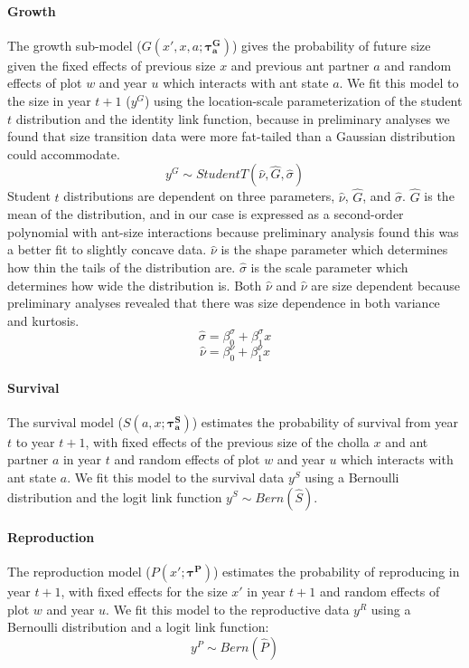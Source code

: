 \documentclass[11pt]{article}
\begin{document}
\paragraph{Growth}
The growth sub-model ($G(x',x,a;\pmb{\tau^G_{a}})$) gives the probability of future size given the fixed effects of previous size $x$ and previous ant partner $a$ and random effects of plot $w$ and year $u$ which interacts with ant state $a$. 
We fit this model to the size in year $t+1$ ($y^G$) using the location-scale parameterization of the student $t$ distribution and the identity link function, because in preliminary analyses we found that size transition data were more fat-tailed than a Gaussian distribution could accommodate. 
$$y^G \sim Student T(\hat{\nu},\hat{G},\hat{\sigma}) $$
Student $t$ distributions are dependent on three parameters, $\hat{\nu}$,  $\hat{G}$, and $\hat{\sigma}$.
$\hat{G}$ is the mean of the distribution, and in our case is expressed as a second-order polynomial with ant-size interactions because  preliminary analysis found this was a better fit to slightly concave data. 
$\hat{\nu}$ is the shape parameter which determines how thin the tails of the distribution are.
$\hat{\sigma}$ is the scale parameter which determines how wide the distribution is. 
Both $\hat{\nu}$ and $\hat{\nu}$ are size dependent because preliminary analyses revealed that there was size dependence in both variance and kurtosis.
$$\hat{\sigma} = \beta_{0}^{\sigma} + \beta_{1}^{\sigma}  x $$
$$\hat{\nu} = \beta_{0}^{\nu} + \beta_{1}^{\nu}  x $$


\paragraph{Survival}
The survival model ($S(a,x;\pmb{\tau_{a}^{S}})$) estimates the probability of survival from year $t$ to year $t+1$, with fixed effects of the previous size of the cholla $x$ and ant partner $a$ in year $t$ and random effects of plot $w$ and year $u$ which interacts with ant state $a$.
We fit this model to the survival data $y^S$  using a Bernoulli distribution and the logit link function
$y^S \sim Bern(\hat{S})$.

\paragraph{Reproduction}
The reproduction model ($P(x';\pmb{\tau^{P}})$) estimates the probability of reproducing in year $t+1$, with fixed effects for the size $x'$ in year $t+1$ and random effects of plot $w$ and year $u$.
We fit this model to the reproductive data $y^R$ using a Bernoulli distribution and a logit link function:
$$y^P \sim Bern(\hat{P})$$
\end{document}
